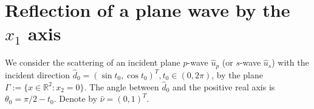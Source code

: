 \documentclass[12pt]{iopart}
\begin{document}
\newcommand{\mL}{\mathscr{L}}
\newcommand{\cT}{{\cal T}}
\newcommand{\cM}{{\cal M}}
\newcommand{\cE}{{\cal E}}
\newcommand{\cL}{{\cal L}}
\newcommand{\cF}{{\cal F}}
\newcommand{\cB}{{\cal B}}
\newcommand{\PML}{{\rm PML}}
\newcommand{\FEM}{{\rm FEM}}
\newcommand{\rd}{\,\mathrm{d}}

\renewcommand{\i}{\mathbf{i}}
\renewcommand{\v}{\mathbf{v}}
\renewcommand{\u}{\mathbf{u}}
\renewcommand{\r}{\mathbf{r}}
\newcommand{\gR}{{\mathbb{R}}}
\newcommand{\Z}{{\mathbb{Z}}}
\newcommand{\C}{{\mathbb{C}}}
\newcommand{\I}{{\mathbb{I}}}
\renewcommand{\Re}{\mathrm{Re}\,}
\renewcommand{\Im}{\mathrm{Im}\,}
\renewcommand{\div}{\mathrm{div}}
\newcommand{\curl}{\mathrm{curl}}
\newcommand{\Curl}{\mathbf{curl}}
\newcommand{\pv}{\mathrm{p.v.}}

\newcommand{\Np}{\mathbb{N}_p}
\newcommand{\Ns}{\mathbb{N}_s}
\newcommand{\Tp}{\mathbb{T}_p}
\newcommand{\Ts}{\mathbb{T}_s}
\newcommand{\Na}{\mathbb{N}_\alpha}
\newcommand{\Nb}{\mathbb{N}_\beta}
\newcommand{\Ta}{\mathbb{T}_\alpha}
\newcommand{\Tb}{\mathbb{T}_\beta}
\newcommand{\GG}{\mathcal{G}}

\newcommand{\N}{\mathbb{N}}
\newcommand{\D}{\mathbb{D}}
\newcommand{\T}{\mathbb{T}}
\newcommand{\A}{\mathbb{A}}
\newcommand{\B}{\mathbb{B}}
\newcommand{\G}{\mathbb{G}}
\newcommand{\F}{\mathbb{F}}
\newcommand{\R}{\mathbb{R}}
\newcommand{\W}{\mathbb{W}}
\newcommand{\V}{\mathbb{V}}
\newcommand{\U}{\mathbb{U}}
\newcommand{\J}{\mathbb{J}}
\newcommand{\Zg}{\mathbb{Z}}
\newcommand{\Gtheta}{\mathbb{\Theta}}
\newcommand{\Gphi}{\mathbb{\Phi}}

\newcommand{\be}{\begin{eqnarray}}
\newcommand{\ee}{\end{eqnarray}}
\newcommand{\ben}{\begin{eqnarray*}}
	\newcommand{\een}{\end{eqnarray*}}
\newcommand{\nn}{\nonumber}
\section{Reflection of a plane wave by the $x_1$ axis}

We consider the scattering of an incident plane $p$-wave  $\hat u_p$ (or $s$-wave $\hat u_s$) with the incident direction $\hat d_0=(\sin t_0, \cos t_0)^T, t_0\in (0,2\pi)$, by the plane $\Gamma := \{x \in \R^2 :x _2 = 0\}$. 
The angle between $\hat d_0$ and the positive real axis is $\theta_0=\pi/2-t_0$. Denote by $\hat\nu=(0,1)^T$.
\end{document}
